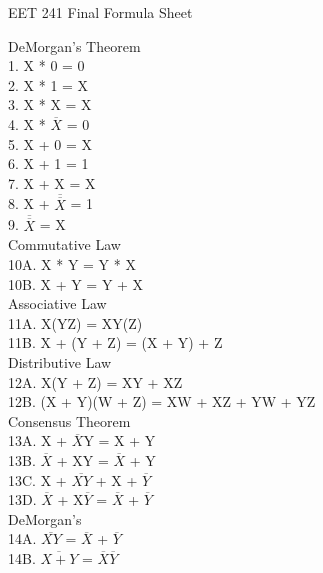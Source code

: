 \documentclass{article}
\begin{document}
EET 241 Final Formula Sheet

DeMorgan's Theorem \\
1. X * 0 = 0 \\
2. X * 1 = X \\
3. X * X = X \\
4. X * $\overline{X}$ = 0 \\
5. X + 0 = X \\
6. X + 1 = 1 \\
7. X + X = X \\
8. X + $\overline{\overline{X}}$ = 1 \\
9. $\overline{\overline{X}}$ = X \\

Commutative Law \\
10A. X * Y = Y * X \\
10B. X + Y = Y + X \\

Associative Law \\
11A. X(YZ) = XY(Z) \\
11B. X + (Y + Z) = (X + Y) + Z \\

Distributive Law \\
12A. X(Y + Z) = XY + XZ \\
12B. (X + Y)(W + Z) = XW + XZ + YW + YZ \\

Consensus Theorem \\
13A. X + $\overline{X}$Y = X + Y \\
13B. $\overline{X}$ + XY = $\overline{X}$ + Y \\
13C. X + $\overline{XY}$ + X + $\overline{Y}$ \\
13D. $\overline{X}$ + X$\overline{Y}$ = $\overline{X}$ + $\overline{Y}$ \\

DeMorgan's \\
14A. $\overline{XY}$ = $\overline{X}$ + $\overline{Y}$ \\
14B. $\overline{X + Y}$ = $\overline{X}$$\overline{Y}$ \\
\end{document}
